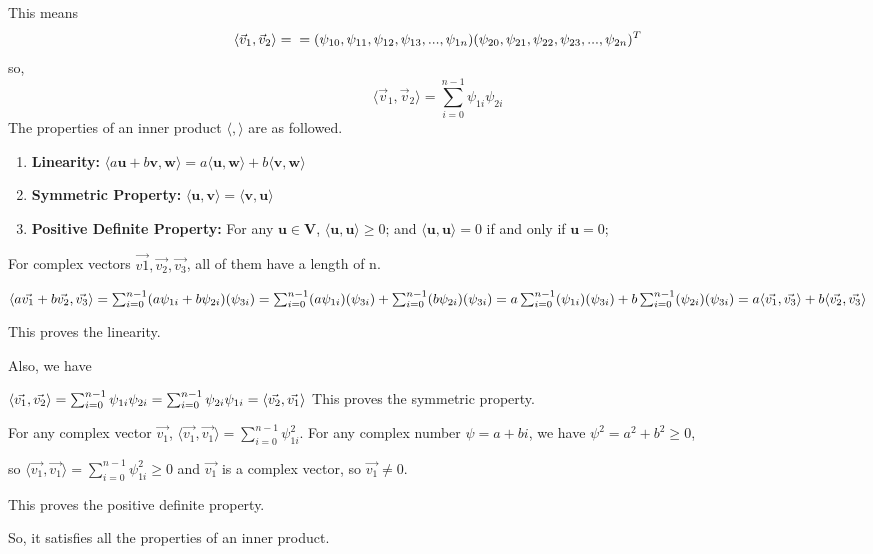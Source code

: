 \documentclass{article}
\begin{document}
\begin{enumerate}
          This means
          \[
              \langle \vec{v}_1,\vec{v}_2 \rangle=\\=(\psi_{10},\psi_{11},\psi_{12},\psi_{13},...,\psi_{1n})(\psi_{20},\psi_{21},\psi_{22},\psi_{23},...,\psi_{2n})^T
          \]
          so,
          \[\langle \vec{v}_1,\vec{v}_2 \rangle=\sum_{i=0}^{n-1}\psi_{1i}\psi_{2i}\]
          The properties of an inner product $\langle,\rangle$ are as followed\cite{ref1}.
          \begin{enumerate}
            \item \textbf{Linearity:} $\langle a\mathbf{u}+b\mathbf{v},\mathbf{w}\rangle=a\langle \mathbf{u,w}\rangle+b\langle \mathbf{v,w}\rangle$
            \item \textbf{Symmetric Property: }$\langle \mathbf{u,v}\rangle=\langle \mathbf{v,u}\rangle$
            \item \textbf{Positive Definite Property: } For any $\mathbf{u\in V}$, $\langle \mathbf{u,u}\rangle\geq0$;
            and $\langle \mathbf{u,u}\rangle=0$ if and only if $\mathbf{u}=0$;
          \end{enumerate}
          For complex vectors $\vec{v1},\vec{v_2},\vec{v_3}$, all of them have a length of n.
          
          $\langle a\vec{v_1}+b\vec{v_2},\vec{v_3}\rangle
          \\=\sum_{i=0}^{n-1}(a\psi_{1i}+b\psi_{2i})(\psi_{3i})
          \\=\sum_{i=0}^{n-1}(a\psi_{1i})(\psi_{3i})+\sum_{i=0}^{n-1}(b\psi_{2i})(\psi_{3i})
          \\=a\sum_{i=0}^{n-1}(\psi_{1i})(\psi_{3i})+b\sum_{i=0}^{n-1}(\psi_{2i})(\psi_{3i})
          \\=a\langle\vec{v_1},\vec{v_3}\rangle+b\langle\vec{v_2},\vec{v_3}\rangle
          $

          This proves the linearity.

          Also, we have 
          
          $\langle \vec{v_1},\vec{v_2}\rangle
          \\=\sum_{i=0}^{n-1}\psi_{1i}\psi_{2i}
          \\=\sum_{i=0}^{n-1}\psi_{2i}\psi_{1i}
          \\=\langle\vec{v_2},\vec{v_1}\rangle
          $
          This proves the symmetric property.

          For any complex vector $\vec{v_1}$, $\langle \vec{v_1},\vec{v_1}\rangle=\sum_{i=0}^{n-1}\psi_{1i}^2$.
          For any complex number $\psi=a+bi$, we have $\psi^2=a^2+b^2\geq0$,

          so $\langle \vec{v_1},\vec{v_1}\rangle=\sum_{i=0}^{n-1}\psi_{1i}^2\geq0$ and $\vec{v_1}$ is a complex vector, so $\vec{v_1}\neq0$.

          This proves the positive definite property.

          So, it satisfies all the properties of an inner product.
\end{enumerate}
\end{document}
